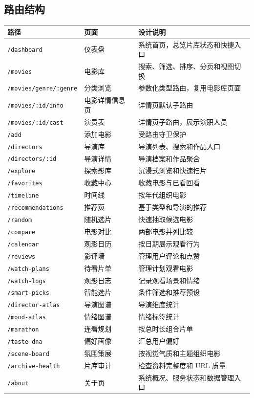\documentclass[
]{ctexart}
\begin{document}
\hypertarget{ux8defux7531ux7ed3ux6784}{%
\subsection{路由结构}\label{ux8defux7531ux7ed3ux6784}}

\begin{longtable}[]{@{}lll@{}}
\toprule
路径 & 页面 & 设计说明 \\
\midrule
\endhead
\texttt{/dashboard} & 仪表盘 & 系统首页，总览片库状态和快捷入口 \\
\texttt{/movies} & 电影库 & 搜索、筛选、排序、分页和视图切换 \\
\texttt{/movies/genre/:genre} & 分类浏览 &
参数化类型路由，复用电影库页面 \\
\texttt{/movies/:id/info} & 电影详情信息页 & 详情页默认子路由 \\
\texttt{/movies/:id/cast} & 演员表 & 详情页子路由，展示演职人员 \\
\texttt{/add} & 添加电影 & 受路由守卫保护 \\
\texttt{/directors} & 导演库 & 导演列表、搜索和作品入口 \\
\texttt{/directors/:id} & 导演详情 & 导演档案和作品聚合 \\
\texttt{/explore} & 探索影库 & 沉浸式浏览和快速扫片 \\
\texttt{/favorites} & 收藏中心 & 收藏电影与已看回看 \\
\texttt{/timeline} & 时间线 & 按年代组织电影 \\
\texttt{/recommendations} & 推荐页 & 基于类型和导演的推荐 \\
\texttt{/random} & 随机选片 & 快速抽取候选电影 \\
\texttt{/compare} & 电影对比 & 两部电影并列比较 \\
\texttt{/calendar} & 观影日历 & 按日期展示观看行为 \\
\texttt{/reviews} & 影评墙 & 管理用户评论和点赞 \\
\texttt{/watch-plans} & 待看片单 & 管理计划观看电影 \\
\texttt{/watch-logs} & 观影日志 & 记录观看场景和情绪 \\
\texttt{/smart-picks} & 智能选片 & 条件筛选和推荐预设 \\
\texttt{/director-atlas} & 导演图谱 & 导演维度统计 \\
\texttt{/mood-atlas} & 情绪图谱 & 情绪标签统计 \\
\texttt{/marathon} & 连看规划 & 按总时长组合片单 \\
\texttt{/taste-dna} & 偏好画像 & 汇总用户偏好 \\
\texttt{/scene-board} & 氛围策展 & 按视觉气质和主题组织电影 \\
\texttt{/archive-health} & 片库审计 & 检查资料完整度和 URL 质量 \\
\texttt{/about} & 关于页 & 系统概况、服务状态和数据管理入口 \\
\bottomrule
\end{longtable}
\end{document}
